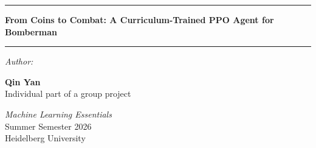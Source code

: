 \documentclass[11pt,a4paper]{report}
\begin{document}
	
	
	\begin{titlepage}
		
		\vspace*{2.2cm}
		
		
		\noindent\rule{\textwidth}{0.7pt}
		
		\vspace{0.35cm}
		
		
		\begin{center}
			
			{\LARGE\bfseries
				From Coins to Combat: A Curriculum-Trained PPO Agent for Bomberman
			}
			
		\end{center}
		
		\vspace{0.35cm}
		
		
		\noindent\rule{\textwidth}{4pt}
		
		\vspace{1.8cm}
		
		
		\noindent
		\begin{minipage}[t]{0.47\textwidth}
			
			\textit{Author:}
			
			\vspace{0.15cm}
			
			\textbf{Qin Yan}\\
			Individual part of a group project
			
		\end{minipage}
		\hfill
		\begin{minipage}[t]{0.47\textwidth}
			
			\raggedleft
			
			\textit{Machine Learning Essentials}\\
			Summer Semester 2026\\
			Heidelberg University
			

\end{minipage}
\end{titlepage}
\end{document}
